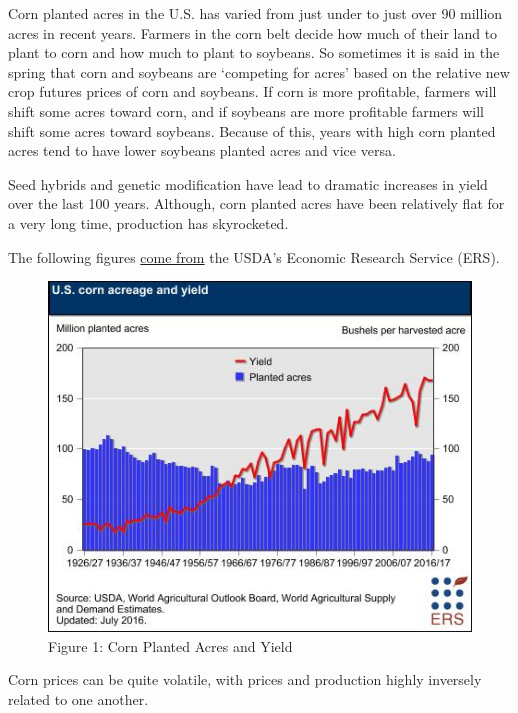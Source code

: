 \documentclass[]{book}
\theoremstyle{definition}
\theoremstyle{definition}
\theoremstyle{remark}
\begin{document}
Corn planted acres in the U.S. has varied from just under to just over
90 million acres in recent years. Farmers in the corn belt decide how
much of their land to plant to corn and how much to plant to soybeans.
So sometimes it is said in the spring that corn and soybeans are
`competing for acres' based on the relative new crop futures prices of
corn and soybeans. If corn is more profitable, farmers will shift some
acres toward corn, and if soybeans are more profitable farmers will
shift some acres toward soybeans. Because of this, years with high corn
planted acres tend to have lower soybeans planted acres and vice versa.

Seed hybrids and genetic modification have lead to dramatic increases in
yield over the last 100 years. Although, corn planted acres have been
relatively flat for a very long time, production has skyrocketed.

The following figures
\href{http://www.ers.usda.gov/topics/crops/corn/background.aspx}{come
from} the USDA's Economic Research Service (ERS).

\begin{figure}[htbp]
\centering
\includegraphics{images/Corn-PA-Yield.png}
\caption{Figure 1: Corn Planted Acres and Yield}
\end{figure}

Corn prices can be quite volatile, with prices and production highly
inversely related to one another.
\end{document}

